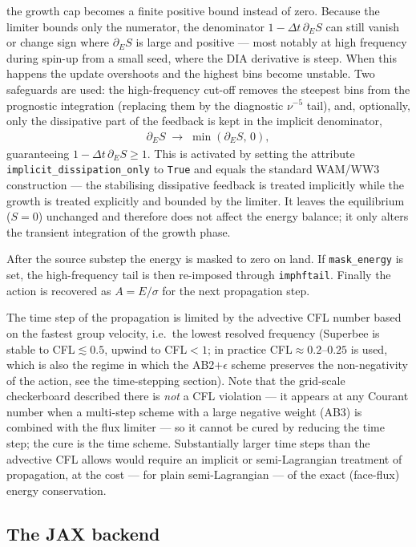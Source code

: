 \documentclass[12pt]{article}
\newcommand{\beq}  { \begin{eqnarray} }
\newcommand{\eeq}  { \end{eqnarray}}
\begin{document}
the growth cap becomes a finite positive bound instead of zero.
Because the limiter bounds only the numerator, the denominator
$1 - \Delta t\, \partial_E S$ can still vanish or change sign where
$\partial_E S$ is large and positive --- most notably at high frequency during
spin-up from a small seed, where the DIA derivative is steep. When this happens
the update overshoots and the highest bins become unstable. Two safeguards are
used: the high-frequency cut-off removes the steepest bins from the prognostic
integration (replacing them by the diagnostic $\nu^{-5}$ tail), and, optionally,
only the dissipative part of the feedback is kept in the implicit denominator,
\beq \label{eq:denomclamp}
\partial_E S \;\rightarrow\; \min\!\left(\partial_E S,\, 0\right),
\eeq
guaranteeing $1 - \Delta t\, \partial_E S \ge 1$. This is activated 
by setting the attribute  \verb|implicit_dissipation_only|  to
\verb|True| and equals  the standard WAM/WW3
construction --- the stabilising dissipative feedback is treated implicitly while
the growth is treated explicitly and bounded by the limiter. It leaves the
equilibrium ($S = 0$) unchanged and therefore does not affect the energy balance;
it only alters the transient integration of the growth phase.

After the source substep the energy is masked to zero on land.
If \verb|mask_energy| is set, the high-frequency tail is then re-imposed
through \verb|imphftail|.
Finally the action is recovered as $A = E/\sigma$ for the next propagation step.


The time step of the propagation is limited by the advective CFL number based
on the fastest group velocity, i.e.\ the lowest resolved frequency (Superbee is
stable to CFL${}\lesssim 0.5$, upwind to CFL${}<1$; in practice CFL${}\approx
0.2$--$0.25$ is used, which is also the regime in which the AB2$+\epsilon$
scheme preserves the non-negativity of the action, see the time-stepping
section). Note that the grid-scale checkerboard described there is \emph{not} a
CFL violation --- it appears at any Courant number when a multi-step scheme
with a large negative weight (AB3) is combined with the flux limiter --- so it
cannot be cured by reducing the time step; the cure is the time scheme.
Substantially larger time steps than the advective CFL allows would require an
implicit or semi-Lagrangian treatment of propagation, at the cost --- for plain
semi-Lagrangian --- of the exact (face-flux) energy conservation.


\subsection*{The JAX backend}
\end{document}
